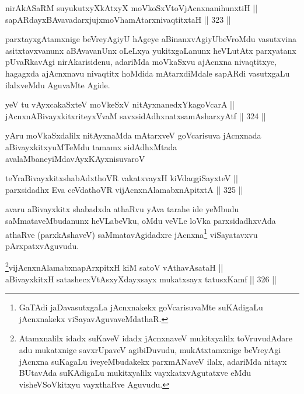 \begin{shl}
nirAkASaRM suyukutxyXkAtxyX moVkoSxV\s toV\s jAcnxnanihunxtiH || \\
sapARdayxBAvavadarxjujxmoVhamAtarxnivaqtitxtaH \hfill || 323 ||  
\end{shl}

\begin{artha}
parxtayxgAtamxnige beVreyAgiyU hAgeye aBinanxvAgiyU\break beVroMdu
vasutxvina asitxtavxvanunx aBAvavanUnx oLeLxya yukitxgaLanunx
heVLutAtx parxyatanx pUvaRkavAgi nirAkarisidenu, adariMda moVkaSxvu
ajAcnxna nivaqtitxye, hagagxda ajAcnxnavu nivaqtitx hoMdida
mAtarxdiMdale sapARdi vasutxgaLu ilalxveMdu AguvaMte Agide.
\end{artha}


\begin{shl}
yeV tu vAyxcakaSxteV moVkeSxV nitAyxnanedxYkagoVcarA || \\
jAcnxnABivayxkitxriteyxVvaM savxsidAdhxnatxsamAsharxyAtf \hfill || 324 ||  
\end{shl}

\begin{artha}
yAru moVkaSxdalilx nitAyxnaMda mAtarxveV goVcarisuva jAcnxnada
aBivayxkitxyuMTeMdu tamamx sidAdhxMtada avalaMbaneyiMda\break vAyxKAyxnisuvaroV
\end{artha}

\begin{shl}
teYraBivayxkitxshabAdxthoVR vakatxvayxH kiVdaqgiSayxteV || \\
parxsidadhx Eva ceVdathoVR vijAcnxnAlamabxnApitxtA \hfill || 325 ||  
\end{shl}

\begin{artha}
avaru aBivayxkitx shabadxda athaRvu yAva tarahe ide yeMbudu
saMmataveMbudanunx heVLabeVku, oMdu veVLe loVka parxsidadhxvAda
athaRve (parxkAshaveV) saMmatavAgidadxre jAcnxna\footnote{GaTAdi
jaDavasutxgaLa jAcnxnakekx goVcarisuvaMte suKAdigaLu jAcnxnakekx
viSayavAguvaveMdathaR.} viSayatavxvu pArxpatxvAguvudu.
\end{artha}



\begin{shl}
\footnote{Atamxnalilx idadx suKaveV idadx jAcnxnaveV mukitxyalilx toVruvudAdare adu mukatxnige savxrUpaveV agibiDuvudu, mukAtxtamxnige beVreyAgi jAcnxna suKagaLu iveyeMbudakekx parxmANaveV ilalx, adariMda nitayx BUtavAda suKAdigaLu mukitxyalilx vayxkatxvAgutatxve eMdu visheVSoVkitxyu vayxthaRve Aguvudu.}vijAcnxnAlamabxnapArxpitxH kiM satoV vA\s thavA\s sataH || \\
aBivayxkitxH satashecxVtAsxyXdayxsayx mukatxsayx tatusxKamf \hfill || 326 ||  
\end{shl}

